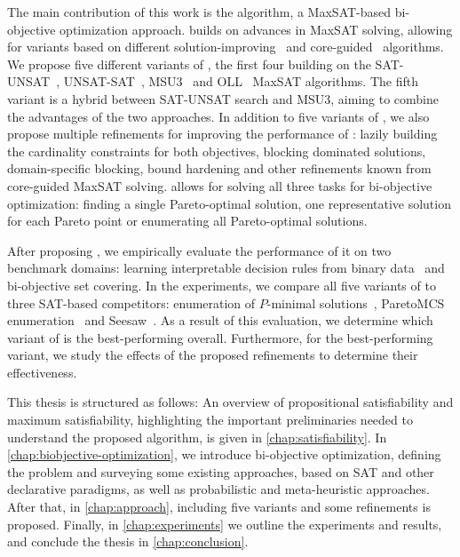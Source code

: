 The main contribution of this work is the \algname{} algorithm, a MaxSAT-based bi-objective optimization approach.
\algname{} builds on advances in MaxSAT solving, allowing for variants based on different solution-improving~\autocites{handbook2-maxsat,DBLP:journals/jsat/BerreP10,DBLP:journals/jsat/EenS06} and core-guided~\autocites{DBLP:journals/corr/abs-0712-1097,DBLP:conf/sat/AnsoteguiBL09,DBLP:conf/cp/MorgadoDM14,DBLP:journals/jsat/IgnatievMM19} algorithms.
We propose five different variants of \algname{}, the first four building on the SAT-UNSAT~\autocite{DBLP:journals/jsat/BerreP10}, UNSAT-SAT~\autocite{DBLP:conf/sat/FuM06}, MSU3~\autocite{DBLP:journals/corr/abs-0712-1097} and OLL~\autocite{DBLP:conf/cp/MorgadoDM14} MaxSAT algorithms.
The fifth variant is a hybrid between SAT-UNSAT search and MSU3, aiming to combine the advantages of the two approaches.
In addition to five variants of \algname{}, we also propose multiple refinements for improving the performance of \algname{}:
lazily building the cardinality constraints for both objectives, blocking dominated solutions, domain-specific blocking, bound hardening and other refinements known from core-guided MaxSAT solving.
\algname{} allows for solving all three tasks for bi-objective optimization:
finding a single Pareto-optimal solution, one representative solution for each Pareto point or enumerating all Pareto-optimal solutions.

After proposing \algname{}, we empirically evaluate the performance of it on two benchmark domains:
learning interpretable decision rules from binary data~\autocite{DBLP:conf/cp/MaliotovM18} and bi-objective set covering.
In the experiments, we compare all five variants of \algname{} to three SAT-based competitors:
enumeration of $P$-minimal solutions~\autocite{DBLP:conf/cp/SohBTB17}, ParetoMCS enumeration~\autocite{DBLP:conf/ijcai/Terra-NevesLM18a} and Seesaw~\autocite{DBLP:conf/cp/JanotaMSM21}.
As a result of this evaluation, we determine which variant of \algname{} is the best-performing overall.
Furthermore, for the best-performing variant, we study the effects of the proposed refinements to determine their effectiveness.

This thesis is structured as follows:
An overview of propositional satisfiability and maximum satisfiability, highlighting the important preliminaries needed to understand the proposed algorithm, is given in \cref{chap:satisfiability}.
In \cref{chap:biobjective-optimization}, we introduce bi-objective optimization, defining the problem and surveying some existing approaches, based on SAT and other declarative paradigms, as well as probabilistic and meta-heuristic approaches.
After that, in \cref{chap:approach}, \algname{} including five variants and some refinements is proposed.
Finally, in \cref{chap:experiments} we outline the experiments and results, and conclude the thesis in \cref{chap:conclusion}.
